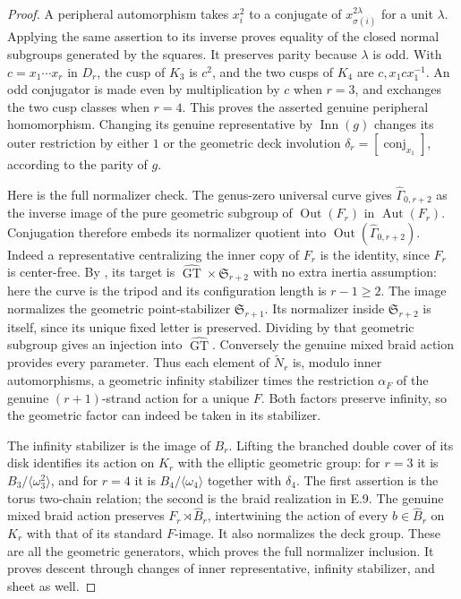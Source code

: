 \begin{proof}
A peripheral automorphism takes $x_i^2$ to a conjugate of
$x_{\sigma(i)}^{2\lambda}$ for a unit $\lambda$.
Applying the same assertion to its inverse proves equality
of the closed normal subgroups generated by the squares.
It preserves parity because $\lambda$ is odd.  With
$c=x_1\cdots x_r$ in $D_r$, the cusp of $K_3$ is $c^2$,
and the two cusps of $K_4$ are $c,x_1cx_1^{-1}$.
An odd conjugator is made even by multiplication by $c$ when
$r=3$, and exchanges the two cusp classes when $r=4$.
This proves the asserted genuine peripheral homomorphism.
Changing its genuine representative by $\operatorname{Inn}(g)$
changes its outer restriction by either $1$ or the geometric
deck involution $\delta_r=[\operatorname{conj}_{x_1}]$, according
to the parity of $g$.

Here is the full normalizer check.  The genus-zero universal
curve gives $\widehat\Gamma_{0,r+2}$ as the inverse image of
the pure geometric subgroup of $\operatorname{Out}(F_r)$ in
$\operatorname{Aut}(F_r)$.  Conjugation therefore embeds its
normalizer quotient into
$\operatorname{Out}(\widehat\Gamma_{0,r+2})$.
Indeed a representative centralizing the inner copy of $F_r$
is the identity, since $F_r$ is center-free.
By \cite[Corollaries 2.6(i), 2.8(i)]{ET_HMM2022}, its target is
$\widehat{\operatorname{GT}}\times\mathfrak S_{r+2}$ with no
extra inertia assumption: here the curve is the tripod and its
configuration length is $r-1\geq2$.  The image normalizes the
geometric point-stabilizer $\mathfrak S_{r+1}$.  Its normalizer
inside $\mathfrak S_{r+2}$ is itself, since its unique fixed
letter is preserved.  Dividing by that geometric subgroup gives
an injection into $\widehat{\operatorname{GT}}$.
Conversely the genuine mixed braid action provides every
parameter.  Thus each element of $\widetilde N_r$ is,
modulo inner automorphisms, a geometric infinity stabilizer
times the restriction $\alpha_F$ of the genuine
$(r+1)$-strand action for a unique $F$.
Both factors preserve infinity, so the geometric factor can
indeed be taken in its stabilizer.

The infinity stabilizer is the image of $B_r$.  Lifting the
branched double cover of its disk identifies its action on
$K_r$ with the elliptic geometric group: for $r=3$ it is
$B_3/\langle\omega _3^2\rangle$, and for $r=4$ it is
$B_4/\langle\omega _4\rangle$ together with $\delta_4$.
The first assertion is the torus two-chain relation; the second
is the braid realization in E.9.  The genuine mixed braid
action preserves $F_r\rtimes\widehat B_r$, intertwining the
action of every $b\in\widehat B_r$ on $K_r$ with that of its
standard $F$-image.  It also normalizes the deck group.
These are all the geometric generators, which proves the full
normalizer inclusion.  It proves descent through changes of
inner representative, infinity stabilizer, and sheet as well.


\end{proof}
